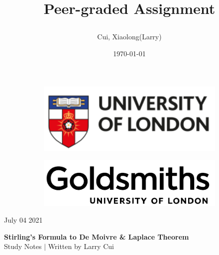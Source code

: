 \documentclass[11pt]{article}
\title{\vspace{-90pt} 



\textbf  {Peer-graded Assignment} }
\author{Cui, Xiaolong(Larry)}
\date{\today}
\begin{document}

\thispagestyle{plain}


\begin{figure}[H] %
  \begin{subfigure}{0.3\textwidth}
    \includegraphics[width=\textwidth]{uol}
  \end{subfigure}
  \hfill
  \begin{subfigure}{0.3\textwidth}
    \includegraphics[width=\textwidth]{goldsmiths}
  \end{subfigure}
\end{figure}


\begin{flushright}

\footnotesize {July 04 2021}
\end{flushright}

\begin{center}
\textbf{Stirling's Formula to De Moivre \& Laplace Theorem} \\
\footnotesize {Study Notes $ | $ Written by Larry Cui}
\end{center}

\end{document}

